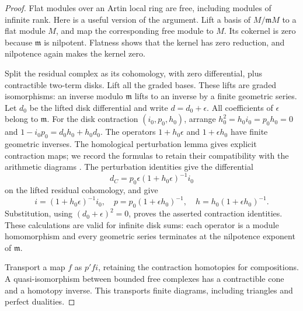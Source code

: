 \begin{proof}
Flat modules over an Artin local ring are free, including modules of infinite
rank.  Here is a useful version of the argument.  Lift a basis of $M/\mathfrak
mM$ to a flat module $M$, and map the corresponding free module to $M$.
Its cokernel is zero because $\mathfrak m$ is nilpotent.  Flatness shows that
the kernel has zero reduction, and nilpotence again makes the kernel zero.

Split the residual complex as its cohomology, with zero differential, plus
contractible two-term disks.  Lift all the graded bases.  These lifts are
graded isomorphisms: an inverse modulo $\mathfrak m$ lifts to an inverse by
a finite geometric series.  Let $d_0$ be the lifted disk differential and
write $d=d_0+\epsilon$.  All coefficients of $\epsilon$ belong to
$\mathfrak m$.  For the disk contraction $(i_0,p_0,h_0)$, arrange
$h_0^2=h_0i_0=p_0h_0=0$ and
$1-i_0p_0=d_0h_0+h_0d_0$.  The operators
$1+h_0\epsilon$ and $1+\epsilon h_0$ have finite geometric inverses.
The homological perturbation lemma gives explicit contraction maps;
we record the formulas to retain their compatibility with the
arithmetic diagrams \citep[Sections~2.2--2.4 and~3.2]{Crainic2004}.
The perturbation identities give the differential
\[
 d_C=p_0\epsilon(1+h_0\epsilon)^{-1}i_0
\]
on the lifted residual cohomology, and give
\[
 i=(1+h_0\epsilon)^{-1}i_0,\quad
 p=p_0(1+\epsilon h_0)^{-1},\quad
 h=h_0(1+\epsilon h_0)^{-1}.
\]
Substitution, using $(d_0+\epsilon)^2=0$, proves the asserted contraction
identities.  These calculations are valid for infinite disk sums: each
operator is a module homomorphism and every geometric series terminates
at the nilpotence exponent of $\mathfrak m$.

Transport a map $f$ as $p'fi$, retaining the contraction homotopies
for compositions. A quasi-isomorphism between bounded free complexes
has a contractible cone and a homotopy inverse. This transports finite
diagrams, including triangles and perfect dualities.
\end{proof}
